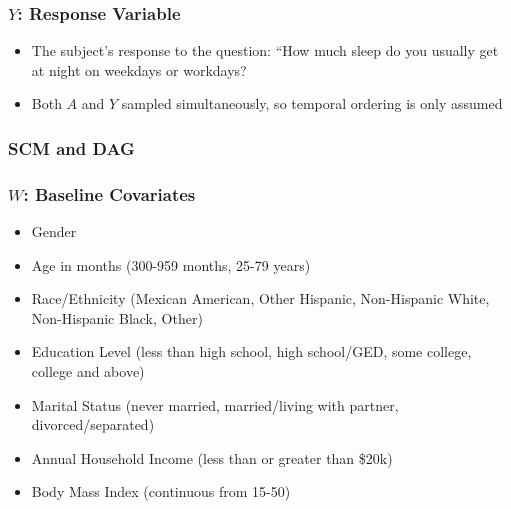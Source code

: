 \documentclass{beamer}
\begin{document}
\begin{frame}
 \frametitle{$Y$: Response Variable}
  \begin{itemize}
    \item The subject's response to the question: ``How much sleep do you usually get at night on weekdays or workdays?
    \item Both $A$ and $Y$ sampled simultaneously, so temporal ordering is only assumed
  \end{itemize}

\end{frame}

\begin{frame}
\frametitle{SCM and DAG}
\end{frame}

\begin{frame}
\frametitle{$W$: Baseline Covariates}
   \begin{itemize}
   \item Gender \\
   \item Age in months (300-959 months, 25-79 years) \\
   \item Race/Ethnicity (Mexican American, Other Hispanic, Non-Hispanic White, Non-Hispanic Black, Other) \\
   \item Education Level (less than high school, high school/GED, some college, college and above) \\
   \item Marital Status (never married, married/living with partner, divorced/separated) \\
   \item Annual Household Income (less than or greater than \$20k) \\
   \item Body Mass Index (continuous from 15-50) \\
  \end{itemize}

\end{frame}
\end{document}
